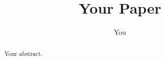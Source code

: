 \documentclass{article}
\title{Your Paper}
\author{You}
\begin{document}
\maketitle

\begin{abstract}
Your abstract.
\end{abstract}







\end{document}
